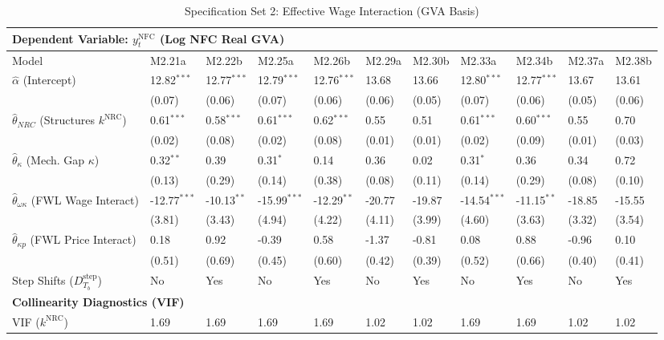 \begin{table}[H]
\centering
\setlength{\tabcolsep}{1.5pt}
\caption{Specification Set 2: Effective Wage Interaction (GVA Basis)}
\label{tab:specB_set2_gva}
\tiny
\begin{tabular}{p{3.5cm}p{1.0cm}p{1.0cm}p{1.0cm}p{1.0cm}p{1.0cm}p{1.0cm}p{1.0cm}p{1.0cm}p{1.0cm}p{1.0cm}}
\toprule
\multicolumn{11}{l}{\textbf{Dependent Variable: $y_t^{\text{NFC}}$ (Log NFC Real GVA)}} \\
\midrule
Model & M2.21a & M2.22b & M2.25a & M2.26b & M2.29a & M2.30b & M2.33a & M2.34b & M2.37a & M2.38b \\
\midrule
$\hat{\alpha}$ (Intercept) & 12.82$^{***}$ & 12.77$^{***}$ & 12.79$^{***}$ & 12.76$^{***}$ & 13.68 & 13.66 & 12.80$^{***}$ & 12.77$^{***}$ & 13.67 & 13.61 \\
 & (0.07) & (0.06) & (0.07) & (0.06) & (0.06) & (0.05) & (0.07) & (0.06) & (0.05) & (0.06) \\
$\hat{\theta}_{NRC}$ (Structures $k^{\text{NRC}}$) & 0.61$^{***}$ & 0.58$^{***}$ & 0.61$^{***}$ & 0.62$^{***}$ & 0.55 & 0.51 & 0.61$^{***}$ & 0.60$^{***}$ & 0.55 & 0.70 \\
 & (0.02) & (0.08) & (0.02) & (0.08) & (0.01) & (0.01) & (0.02) & (0.09) & (0.01) & (0.03) \\
$\hat{\theta}_{\kappa}$ (Mech. Gap $\kappa$) & 0.32$^{**}$ & 0.39 & 0.31$^{*}$ & 0.14 & 0.36 & 0.02 & 0.31$^{*}$ & 0.36 & 0.34 & 0.72 \\
 & (0.13) & (0.29) & (0.14) & (0.38) & (0.08) & (0.11) & (0.14) & (0.29) & (0.08) & (0.10) \\
$\hat{\theta}_{\omega\kappa}$ (FWL Wage Interact) & -12.77$^{***}$ & -10.13$^{**}$ & -15.99$^{***}$ & -12.29$^{**}$ & -20.77 & -19.87 & -14.54$^{***}$ & -11.15$^{**}$ & -18.85 & -15.55 \\
 & (3.81) & (3.43) & (4.94) & (4.22) & (4.11) & (3.99) & (4.60) & (3.63) & (3.32) & (3.54) \\
$\hat{\theta}_{\kappa p}$ (FWL Price Interact) & 0.18 & 0.92 & -0.39 & 0.58 & -1.37 & -0.81 & 0.08 & 0.88 & -0.96 & 0.10 \\
 & (0.51) & (0.69) & (0.45) & (0.60) & (0.42) & (0.39) & (0.52) & (0.66) & (0.40) & (0.41) \\
Step Shifts ($D_{T_b}^{\text{step}}$) & No & Yes & No & Yes & No & Yes & No & Yes & No & Yes \\
\midrule
\multicolumn{11}{l}{\textbf{Collinearity Diagnostics (VIF)}} \\
VIF ($k^{\text{NRC}}$) & 1.69 & 1.69 & 1.69 & 1.69 & 1.02 & 1.02 & 1.69 & 1.69 & 1.02 & 1.02 \\

\end{tabular}
\end{table}
